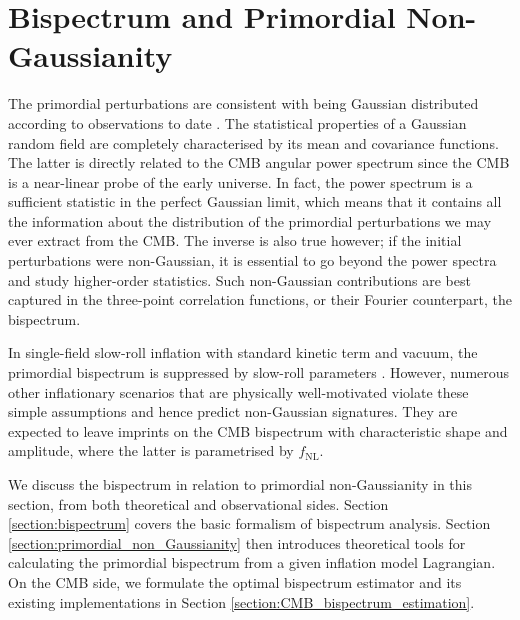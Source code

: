 \chapter{Bispectrum and Primordial Non-Gaussianity}

\ifpdf
    \graphicspath{{Chapter3/Figs/Raster/}{Chapter3/Figs/PDF/}{Chapter3/Figs/}}
\else
    \graphicspath{{Chapter3/Figs/Vector/}{Chapter3/Figs/}}
\fi

The primordial perturbations are consistent with being Gaussian distributed according to observations to date \cite{PlanckCollaboration2018}. The statistical properties of a Gaussian random field are completely characterised by its mean and covariance functions. The latter is directly related to the CMB angular power spectrum since the CMB is a near-linear probe of the early universe. In fact, the power spectrum is a sufficient statistic in the perfect Gaussian limit, which means that it contains all the information about the distribution of the primordial perturbations we may ever extract from the CMB. The inverse is also true however; if the initial perturbations were non-Gaussian, it is essential to go beyond the power spectra and study higher-order statistics. Such non-Gaussian contributions are best captured in the three-point correlation functions, or their Fourier counterpart, the bispectrum.

In single-field slow-roll inflation with standard kinetic term and vacuum, the primordial bispectrum is suppressed by slow-roll parameters \cite{Maldacena2013}. However, numerous other inflationary scenarios that are physically well-motivated violate these simple assumptions and hence predict non-Gaussian signatures. They are expected to leave imprints on the CMB bispectrum with characteristic shape and amplitude, where the latter is parametrised by $f_\text{NL}$.

We discuss the bispectrum in relation to primordial non-Gaussianity in this section, from both theoretical and observational sides. Section \ref{section:bispectrum} covers the basic formalism of bispectrum analysis. Section \ref{section:primordial_non_Gaussianity} then introduces theoretical tools for calculating the primordial bispectrum from a given inflation model Lagrangian. On the CMB side, we formulate the optimal bispectrum estimator and its existing implementations in Section \ref{section:CMB_bispectrum_estimation}.


